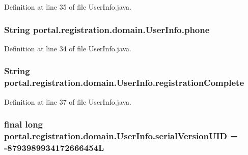 Definition at line 35 of file UserInfo.java.

\hypertarget{classportal_1_1registration_1_1domain_1_1UserInfo_af6775663ccce32e01fc070f1342f523f}{
\subsubsection[{phone}]{\setlength{\rightskip}{0pt plus 5cm}String {\bf portal.registration.domain.UserInfo.phone}}}
\label{classportal_1_1registration_1_1domain_1_1UserInfo_af6775663ccce32e01fc070f1342f523f}


Definition at line 34 of file UserInfo.java.

\hypertarget{classportal_1_1registration_1_1domain_1_1UserInfo_ab5145405b331d11672cd66053ceb012c}{
\subsubsection[{registrationComplete}]{\setlength{\rightskip}{0pt plus 5cm}String {\bf portal.registration.domain.UserInfo.registrationComplete}}}
\label{classportal_1_1registration_1_1domain_1_1UserInfo_ab5145405b331d11672cd66053ceb012c}


Definition at line 37 of file UserInfo.java.

\hypertarget{classportal_1_1registration_1_1domain_1_1UserInfo_aea84836830b4057e574b59aad5679de8}{
\subsubsection[{serialVersionUID}]{\setlength{\rightskip}{0pt plus 5cm}final long {\bf portal.registration.domain.UserInfo.serialVersionUID} = -\/8793989934172666454L}}
\label{classportal_1_1registration_1_1domain_1_1UserInfo_aea84836830b4057e574b59aad5679de8}


